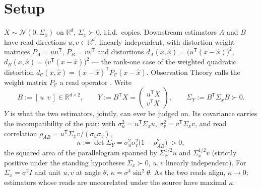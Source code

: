 \documentclass[11pt]{article}
\begin{document}
\section{Setup}\label{sec:setup}
$X\sim\mathcal N(0,\Sigma_x)$ on $\mathbb R^d$, $\Sigma_x\succ0$, i.i.d.\
copies. Downstream estimators $A$ and $B$ have read directions
$u,v\in\mathbb R^d$, linearly independent, with distortion weight matrices
$P_A=uu^{\mathsf T}$,
$P_B=vv^{\mathsf T}$ and distortions
$d_A(x,\hat x)=\bigl(u^{\mathsf T}(x-\hat x)\bigr)^2$,
$d_B(x,\hat x)=\bigl(v^{\mathsf T}(x-\hat x)\bigr)^2$ --- the rank-one case of
the weighted quadratic distortion $d_{\mathcal C}(x,\hat x)=
(x-\hat x)^{\mathsf T}P_{\mathcal C}(x-\hat x)$. Observation Theory calls the
weight matrix $P_{\mathcal C}$ a read operator \cite{bond2026observation}.
Write
\[
B:=[\,u\ \ v\,]\in\mathbb R^{d\times2},\qquad
Y:=B^{\mathsf T}X=\begin{pmatrix}u^{\mathsf T}X\\ v^{\mathsf T}X\end{pmatrix},
\qquad \Sigma_Y:=B^{\mathsf T}\Sigma_x B\succ0 .
\]
$Y$ is what the two estimators, jointly, can ever be judged on. Its covariance
carries the incompatibility of the pair: with
$\sigma_u^2=u^{\mathsf T}\Sigma_x u$, $\sigma_v^2=v^{\mathsf T}\Sigma_x v$,
and read correlation
$\rho_{AB}=u^{\mathsf T}\Sigma_x v/(\sigma_u\sigma_v)$,
\begin{equation}
\kappa:=\det\Sigma_Y
=\sigma_u^2\sigma_v^2\bigl(1-\rho_{AB}^2\bigr)\ >0,
\label{eq:kappa}
\end{equation}
the squared area of the parallelogram spanned by $\Sigma_x^{1/2}u$ and
$\Sigma_x^{1/2}v$ (strictly positive under the standing hypotheses
$\Sigma_x\succ0$, $u,v$ linearly independent). For $\Sigma_x=\sigma^2 I$ and
unit $u,v$ at angle $\theta$, $\kappa=\sigma^4\sin^2\theta$. As the
two reads align, $\kappa\to0$;
estimators whose reads are uncorrelated under the source have maximal
$\kappa$.
\end{document}
